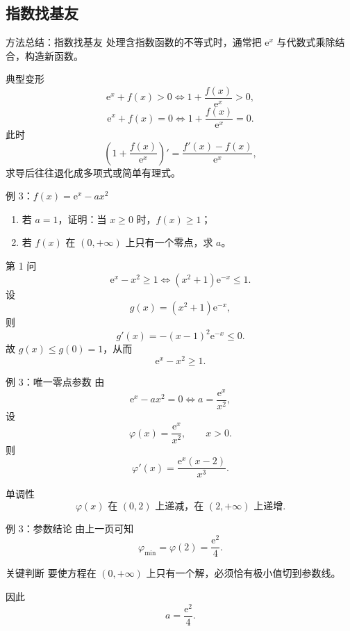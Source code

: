 ﻿\documentclass[aspectratio=169,11pt]{ctexbeamer}
\newcommand{\e}{\mathrm{e}}
\begin{document}
\subsection{指数找基友}

\begin{frame}{方法总结：指数找基友}
\small
处理含指数函数的不等式时，通常把 $\e^x$ 与代数式\alert{乘除结合}，构造新函数。

\begin{block}{典型变形}
\[
\e^x+f(x)>0
\Longleftrightarrow
1+\frac{f(x)}{\e^x}>0,
\]
\[
\e^x+f(x)=0
\Longleftrightarrow
1+\frac{f(x)}{\e^x}=0.
\]
此时
\[
\left(1+\frac{f(x)}{\e^x}\right)'=\frac{f'(x)-f(x)}{\e^x},
\]
求导后往往退化成多项式或简单有理式。
\end{block}
\end{frame}

\begin{frame}{例 3：$f(x)=\e^x-ax^2$}
\small
\begin{enumerate}
  \item 若 $a=1$，证明：当 $x\ge 0$ 时，$f(x)\ge 1$；
  \item 若 $f(x)$ 在 $(0,+\infty)$ 上只有一个零点，求 $a$。
\end{enumerate}

\pause
\begin{block}{第 1 问}
\[
\e^x-x^2\ge 1
\Longleftrightarrow
(x^2+1)\e^{-x}\le 1.
\]
设
\[
g(x)=(x^2+1)\e^{-x},
\]
则
\[
g'(x)=-(x-1)^2\e^{-x}\le 0.
\]
故 $g(x)\le g(0)=1$，从而
\[
\boxed{\e^x-x^2\ge 1}.
\]
\end{block}
\end{frame}

\begin{frame}{例 3：唯一零点参数}
\small
由
\[
\e^x-ax^2=0 \Longleftrightarrow a=\frac{\e^x}{x^2},
\]
设
\[
\varphi(x)=\frac{\e^x}{x^2},\qquad x>0.
\]
则
\[
\varphi'(x)=\frac{\e^x(x-2)}{x^3}.
\]

\begin{block}{单调性}
\[
\varphi(x)\text{ 在 }(0,2)\text{ 上递减，在 }(2,+\infty)\text{ 上递增}.
\]
\end{block}
\end{frame}

\begin{frame}{例 3：参数结论}
\small
由上一页可知
\[
\varphi_{\min}=\varphi(2)=\frac{\e^2}{4}.
\]

\begin{block}{关键判断}
要使方程在 $(0,+\infty)$ 上只有一个解，必须恰有极小值切到参数线。
\end{block}

因此
\[
\boxed{a=\frac{\e^2}{4}}.
\]
\end{frame}
\end{document}

